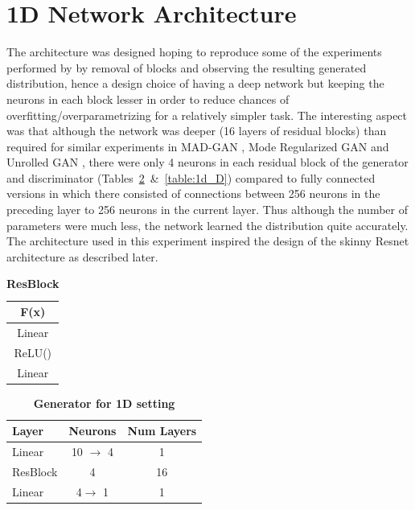 \documentclass[10pt,twocolumn,letterpaper]{article}
\newcommand{\ow}[1]{\textbf{\textcolor[rgb]{.1, .1, .8}{OW: #1}}}
\begin{document}
\section{1D Network Architecture}
The architecture was designed hoping to reproduce some of the experiments performed by \cite{veit2016residual} by removal of blocks and observing the resulting generated distribution, hence a design choice of having a deep network but keeping the neurons in each block lesser in order to reduce chances of overfitting/overparametrizing for a relatively simpler task. The interesting aspect was that although the network was deeper (16 layers of residual blocks) than required for similar experiments in MAD-GAN \cite{ghosh2017multi}, Mode Regularized GAN \cite{che2016mode} and Unrolled GAN \cite{metz2017unrolledGAN}, there were only 4 neurons in each residual block of the generator and discriminator (Tables~\ref{table:1d_G}~\&~\ref{table:1d_D}) compared to fully connected versions in which there consisted of connections between 256 neurons in the preceding layer to 256 neurons in the current layer. Thus although the number of parameters were much less, the network learned the distribution quite accurately. The architecture used in this experiment inspired the design of the skinny Resnet architecture as described later.

\begin{table}[ht]
\caption{\textbf{ResBlock}} %
\centering %
\begin{tabular}{c} %
\toprule
\textbf{F(x)}\\\midrule
Linear\\ %
ReLU() \\
Linear\\
\bottomrule %
\end{tabular}
\label{table:resblock} %
\end{table}

\begin{table}[ht]
\caption{\textbf{Generator for 1D setting}} %
\centering %
\begin{tabular}{l c c}
\toprule
\textbf{Layer} & \textbf{Neurons} & \textbf{Num Layers} \\ \midrule
Linear & 10 $\rightarrow$ 4 & 1  \\ %
ResBlock & 4 & 16 \\ 
Linear & 4$\rightarrow$ 1 & 1 \\ 
\bottomrule %
\end{tabular}
\label{table:1d_G} %
\end{table}
\end{document}

